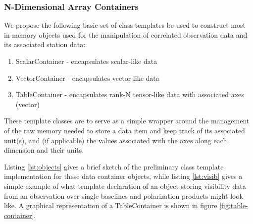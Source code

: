 \documentclass[hidelinks]{article}
\let\Oldsubsubsection\subsubsection
\renewcommand{\subsubsection}{\FloatBarrier\Oldsubsubsection}
\begin{document}
\subsubsection{N-Dimensional Array Containers}

We propose the following basic set of class templates be used to construct most in-memory objects used for the manipulation of correlated observation data and its associated station data:
\begin{enumerate}
 \item ScalarContainer - encapsulates scalar-like data 
 \item VectorContainer - encapsulates vector-like data
 \item TableContainer - encapsulates rank-N tensor-like data with associated axes (vector)
\end{enumerate}
These template classes are to serve as a simple wrapper around the management of the raw memory needed to store a data item and keep track of its associated unit(s), 
and (if applicable) the values associated with the axes along each dimension and their units.

Listing \ref{lst:objects} gives a brief sketch of the preliminary class template implementation for these data container objects, while listing \ref{lst:visib} gives a simple example of what template declaration of an object storing visibility data from an observation over single baselines and polarization products might look like.
A graphical representation of a TableContainer is shown in figure \ref{fig:table-container}.




\end{document}
